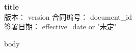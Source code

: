 \documentclass[12pt]{article}
\begin{document}
\begin{center}
{\LARGE \textbf{ {{ title }} }}\\[1em]
版本：{{ version }}\quad 合同编号：{{ document_id }}\\
签署日期：{{ effective_date or "未定" }}\\
\end{center}

{{ body }}
\end{document}
